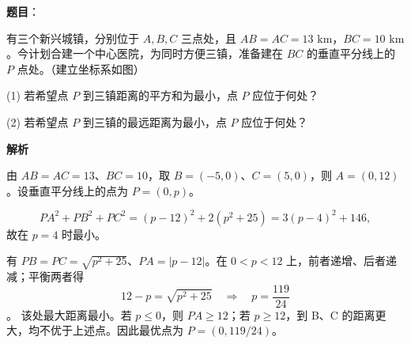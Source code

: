 \begin{answer}

\textbf{题目}：

有三个新兴城镇，分别位于 \(A,B,C\) 三点处，且 \(AB=AC=13\text{ km}\)，\(BC=10\text{ km}\)。今计划合建一个中心医院，为同时方便三镇，准备建在 \(BC\) 的垂直平分线上的 \(P\) 点处。（建立坐标系如图）

(1) 若希望点 \(P\) 到三镇距离的平方和为最小，点 \(P\) 应位于何处？

(2) 若希望点 \(P\) 到三镇的最远距离为最小，点 \(P\) 应位于何处？
\nopagebreak[4]
\begin{center}\end{center}
\nopagebreak[4]
\textbf{解析}

由 \(AB=AC=13\)、\(BC=10\)，取 \(B=(-5,0)\)、\(C=(5,0)\)，则 \(A=(0,12)\)。设垂直平分线上的点为 \(P=(0,p)\)。

\nopagebreak[4]
\[
PA^2+PB^2+PC^2=(p-12)^2+2(p^2+25)=3(p-4)^2+146,
\]
故在 \(p=4\) 时最小。


有 \(PB=PC=\sqrt{p^2+25}\)、\(PA=|p-12|\)。在 \(0<p<12\) 上，前者递增、后者递减；平衡两者得
\nopagebreak[4]
\[
12-p=\sqrt{p^2+25}\quad\Longrightarrow\quad p=\frac{119}{24}
\]
。
该处最大距离最小。若 \(p\le0\)，则 \(PA\ge12\)；若 \(p\ge12\)，到 B、C 的距离更大，均不优于上述点。因此最优点为 \(P=(0,119/24)\)。



\end{answer}

